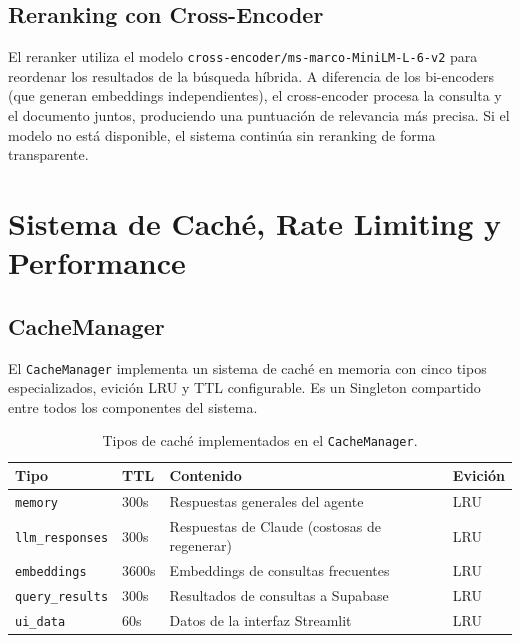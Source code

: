 ﻿\documentclass[11pt,a4paper]{article}
\begin{document}
\subsection{Reranking con Cross-Encoder}

El reranker utiliza el modelo \texttt{cross-encoder/ms-marco-MiniLM-L-6-v2} para reordenar los resultados de la b\'usqueda h\'ibrida. A diferencia de los bi-encoders (que generan embeddings independientes), el cross-encoder procesa la consulta y el documento juntos, produciendo una puntuaci\'on de relevancia m\'as precisa. Si el modelo no est\'a disponible, el sistema contin\'ua sin reranking de forma transparente.

\section{Sistema de Cach\'e, Rate Limiting y Performance}

\subsection{CacheManager}

El \texttt{CacheManager} implementa un sistema de cach\'e en memoria con cinco tipos especializados, evici\'on LRU y TTL configurable. Es un Singleton compartido entre todos los componentes del sistema.

\begin{table}[H]
\centering
\caption{Tipos de cach\'e implementados en el \texttt{CacheManager}.}
\label{tab:cache}
\begin{tabularx}{\textwidth}{llXl}
\toprule
\textbf{Tipo} & \textbf{TTL} & \textbf{Contenido} & \textbf{Evici\'on} \\
\midrule
\texttt{memory} & 300s & Respuestas generales del agente & LRU \\
\texttt{llm\_responses} & 300s & Respuestas de Claude (costosas de regenerar) & LRU \\
\texttt{embeddings} & 3600s & Embeddings de consultas frecuentes & LRU \\
\texttt{query\_results} & 300s & Resultados de consultas a Supabase & LRU \\
\texttt{ui\_data} & 60s & Datos de la interfaz Streamlit & LRU \\
\bottomrule
\end{tabularx}
\end{table}
\end{document}
